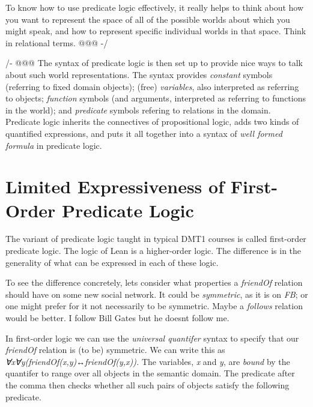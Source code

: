 \documentclass{book}
\begin{document}
To know how to use predicate logic effectively, it really
helps to think about how you want to represent the space of
all of the possible worlds about which you might speak, and
how to represent specific individual worlds in that space.
Think in relational terms. @@@ -/

/- @@@ The syntax of predicate logic is then set up to provide
nice ways to talk about such world representations. The
syntax provides \emph{constant} symbols (referring to fixed
domain objects); (free) \emph{variables}, also interpreted as
referring to objects; \emph{function} symbols (and arguments,
interpreted as referring to functions in the world); and
\emph{predicate} symbols refering to relations in the domain.
Predicate logic inherits the connectives of propositional
logic, adds two kinds of quantified expressions, and puts
it all together into a syntax of \emph{well formed formula} in
predicate logic.

\hypertarget{book__pandoc__debug__src__predlogic.md__limited-expressiveness-of-first-order-predicate-logic}{%
\section*{Limited Expressiveness of First-Order Predicate Logic}\label{book__pandoc__debug__src__predlogic.md__limited-expressiveness-of-first-order-predicate-logic}}

The variant of predicate logic taught in typical DMT1 courses
is called first-order predicate logic. The logic of Lean is a
higher-order logic. The difference is in the generality of what
can be expressed in each of these logic.

To see the difference concretely, let\textquotesingle s consider what properties
a \emph{friendOf} relation should have on some new social network. It
could be \emph{symmetric}, as it is on \emph{FB}; or one might prefer for
it not necessarily to be symmetric. Maybe a \emph{follows} relation
would be better. I follow Bill Gates but he doesn\textquotesingle t follow me.

In first-order logic we can use the \emph{universal quantifer} syntax
to specify that our \emph{friendOf} relation is (to be) symmetric. We can
write this as \emph{∀x∀y(friendOf(x,y)↔friendOf(y,x)).} The variables,
\emph{x} and \emph{y}, are \emph{bound} by the quantifer to range over all objects
in the semantic domain. The predicate after the comma then checks
whether all such pairs of objects satisfy the following predicate.
\end{document}
